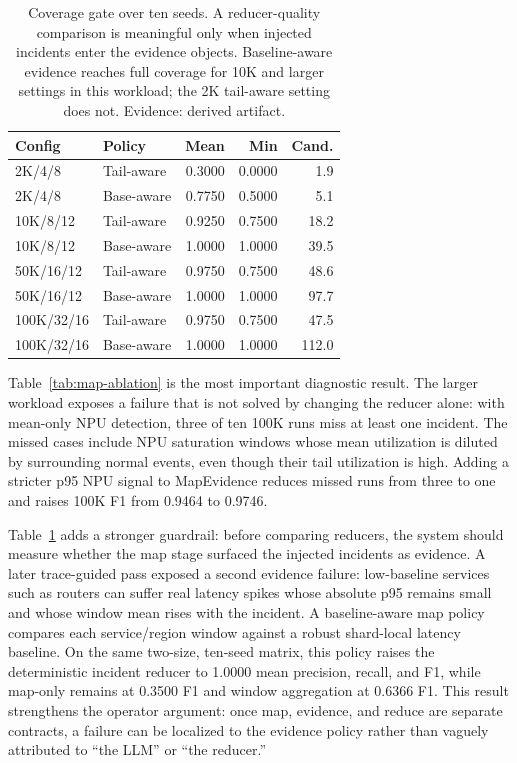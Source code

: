 \documentclass[sigplan,anonymous,nonacm]{acmart}
\begin{document}
\begin{table}[t]
\caption{Coverage gate over ten seeds. A reducer-quality comparison is meaningful only when injected incidents enter the evidence objects. Baseline-aware evidence reaches full coverage for 10K and larger settings in this workload; the 2K tail-aware setting does not. Evidence: derived artifact.}
\label{tab:coverage-gate}
\centering
\normalsize
\begin{tabular*}{\columnwidth}{@{\extracolsep{\fill}}llrrr@{}}
\toprule
Config & Policy & Mean & Min & Cand. \\
\midrule
2K/4/8 & Tail-aware & 0.3000 & 0.0000 & 1.9 \\
2K/4/8 & Base-aware & 0.7750 & 0.5000 & 5.1 \\
10K/8/12 & Tail-aware & 0.9250 & 0.7500 & 18.2 \\
10K/8/12 & Base-aware & 1.0000 & 1.0000 & 39.5 \\
50K/16/12 & Tail-aware & 0.9750 & 0.7500 & 48.6 \\
50K/16/12 & Base-aware & 1.0000 & 1.0000 & 97.7 \\
100K/32/16 & Tail-aware & 0.9750 & 0.7500 & 47.5 \\
100K/32/16 & Base-aware & 1.0000 & 1.0000 & 112.0 \\
\bottomrule
\end{tabular*}
\end{table}

Table~\ref{tab:map-ablation} is the most important diagnostic result. The larger workload exposes a failure that is not solved by changing the reducer alone: with mean-only NPU detection, three of ten 100K runs miss at least one incident. The missed cases include NPU saturation windows whose mean utilization is diluted by surrounding normal events, even though their tail utilization is high. Adding a stricter p95 NPU signal to \textsf{MapEvidence} reduces missed runs from three to one and raises 100K F1 from 0.9464 to 0.9746.

Table~\ref{tab:coverage-gate} adds a stronger guardrail: before comparing reducers, the system should measure whether the map stage surfaced the injected incidents as evidence. A later trace-guided pass exposed a second evidence failure: low-baseline services such as routers can suffer real latency spikes whose absolute p95 remains small and whose window mean rises with the incident. A baseline-aware map policy compares each service/region window against a robust shard-local latency baseline. On the same two-size, ten-seed matrix, this policy raises the deterministic incident reducer to 1.0000 mean precision, recall, and F1, while map-only remains at 0.3500 F1 and window aggregation at 0.6366 F1. This result strengthens the operator argument: once map, evidence, and reduce are separate contracts, a failure can be localized to the evidence policy rather than vaguely attributed to ``the LLM'' or ``the reducer.''
\end{document}

